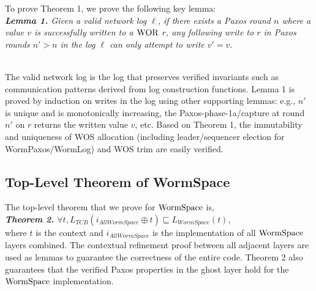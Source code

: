 \noindent To prove Theorem 1, we prove the following key lemma: 
\\
\textit{\textbf{Lemma 1.} Given a valid network log $\ell$, if there exists a Paxos round $n$ where a value $v$ is successfully written to a $\mathrm{WOR}$ $r$, any following write to $r$ in Paxos rounds $n' > n$ in the log $\ell$
can only attempt to write $v' = v$.}

\noindent\\
	The valid network log is the log that preserves verified invariants such as communication patterns derived from log construction functions.
Lemma 1 is proved by induction on writes in the log using other supporting lemmas: e.g., $n'$ is unique and is monotonically increasing, the Paxos-phase-1a/capture at round $n'$ on $r$ returns the written value $v$, etc.
Based on Theorem 1, the immutability and uniqueness of WOS allocation (including leader/sequencer election for WormPaxos/WormLog) and WOS trim are easily verified. 




\subsection{Top-Level Theorem of WormSpace}
	The top-level theorem that we prove for $\mathrm{WormSpace}$ is, \\
\textit{\textbf{Theorem 2.} $\forall t, L_{TCB} (i_{AllWormSpace} \oplus t) \sqsubseteq L_{WormSpace} (t)$}, \\
where $t$ is the context and $i_{AllWormSpace}$ is the implementation of all $\mathrm{WormSpace}$ layers combined. The contextual refinement proof between all adjacent layers are used as lemmas to guarantee the correctness of the entire code. Theorem 2 also guarantees that the verified Paxos properties in the ghost layer hold for the $\mathrm{WormSpace}$ implementation.



